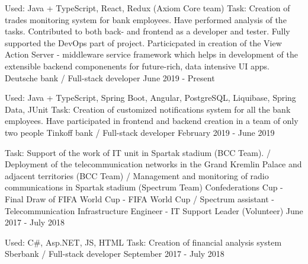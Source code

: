 

\vspace{0cm}\begin{cventries}
\cventry
{Used: Java + TypeScript, React, Redux (Axiom Core team)
	\newline Task: Creation of trades monitoring system for bank employees. Have performed analysis of the tasks. Contributed to both back- and frontend as a developer and tester. Fully supported the DevOps part of project.	
	\newline Particicpated in creation of the View Action Server - middleware service  framework which helps in development of the extensible backend componenents for future-rich, data intensive UI apps.
} %
{Deutsche bank / Full-stack developer} %
{} %
{June 2019 - Present} %
\noindent	
	
\cventry
{Used: Java + TypeScript, Spring Boot, Angular, PostgreSQL, Liquibase, Spring Data, JUnit
	\newline Task: Creation of customized notifications system for all the bank employees. Have participated in frontend and backend creation in a team of only two people} %
{Tinkoff bank / Full-stack developer } %
{} %
{February 2019 - June 2019} %
\noindent	
	
\cventry
{Task: Support of the work of IT unit in Spartak stadium (BCC Team). /
Deployment of the telecommunication networks in the Grand Kremlin Palace and adjacent territories (BCC Team) /
Management and monitoring of radio communications in Spartak stadium (Spectrum Team)} %
{Confederations Cup - Final Draw of FIFA World Cup - FIFA World Cup / 
	Spectrum assistant - Telecommunication Infrastructure Engineer  - IT Support Leader (Volunteer)} %
{} %
{June 2017 - July 2018} %
\noindent	

\cventry
{Used: C\#, Asp.NET, JS, HTML
	\newline Task: Creation of financial analysis system} %
{Sberbank / Full-stack developer} %
{} %
{September 2017 - July 2018} %
\noindent	


\end{cventries}
